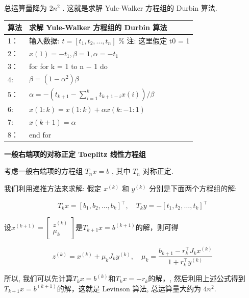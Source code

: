 \documentclass[12pt,a4paper]{article}
\begin{document}
总运算量降为 $2n^2$
. 这就是求解 Yule-Walker 方程组的 Durbin 算法.

\begin{table}  
	\begin{tabular*}{16cm}{ll}  
		\hline  
		算法  &求解 Yule-Walker 方程组的 Durbin 算法\\  
		\hline  
		1：   & 输入数据: $t = [t_1, t_2, . . . , t_n]$ \% 注: 这里假定 t0 = 1\\  
		2：   & $x(1) = −t_1, β = 1, α = −t_1$\\
		3：   & for for k = 1 to n − 1 do \\
		4:    & \qquad $\beta=(1-\alpha^2)\beta$\\
		5：   & \qquad $\alpha=-\left(t_{k+1}-\sum_{i=1}^{k} t_{k+1-i} x(i)\right) / \beta$\\
		6:    & \qquad $x(1 : k)=x(1 : k)+\alpha x(k :-1 : 1)$\\
		7:   &$x(k+1)=\alpha$\\
		8：   & end for\\
		\hline  
	\end{tabular*}  
\end{table}


{\bfseries 一般右端项的对称正定 Toeplitz 线性方程组}

考虑一般右端项的方程组 $T_nx = b$ , 其中 $T_n$ 对称正定.

我们利用递推方法来求解: 假定 $x^{(k)}$ 和 $y^{(k)}$ 分别是下面两个方程组的解:

\begin{equation}
T_{k} x=\left[b_{1}, b_{2}, \ldots, b_{k}\right]^{\top}, \quad T_{k} y=-\left[t_{1}, t_{2}, \ldots, t_{k}\right]^{\top}
\end{equation}

设$x^{(k+1)}=\left[\begin{array}{c}{z^{(k)}} \\ {\mu_{k}}\end{array}\right]$是$T_{k+1} x=b^{(k+1)}$的解，则可得

\begin{equation}
z^{(k)}=x^{(k)}+\mu_{k} J_{k} y^{(k)}, \quad \mu_{k}=\frac{b_{k+1}-r_{k}^{\top} J_{k} x^{(k)}}{1+r_{k}^{\top} y^{(k)}}
\end{equation}

所以, 我们可以先计算$T_{k} x=b^{(k)}$和$T_{k} x=-r_{k}$的解，, 然后利用上述公式得到$T_{k+1} x=b^{(k+1)}$的解，这就是 Levinson 算法, 总运算量大约为 $4n^2$.
\end{document}
